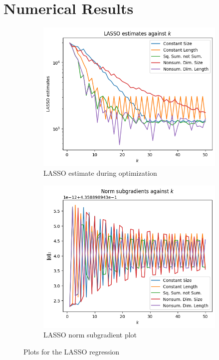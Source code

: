 \documentclass[journal,onecolumn]{IEEEtran}
\begin{document}
\section{Numerical Results}\label{sec:results}
\begin{figure}[htbp]
    \centering
    \begin{subfigure}{0.49\textwidth}
        \centering
        \includegraphics[width = \linewidth]{Figures/LASSO output.png}
        \caption{LASSO estimate during optimization}
        \label{fig:lasso estimates}
    \end{subfigure}
    \begin{subfigure}{0.49\textwidth}
        \centering
        \includegraphics[width = \linewidth]{Figures/LASSO norm grads.png}
        \caption{LASSO norm subgradient plot}
        \label{fig:lasso sg norm}
    \end{subfigure}
    \caption{Plots for the LASSO regression}
    \label{fig:lasso results}
\end{figure}
\end{document}
